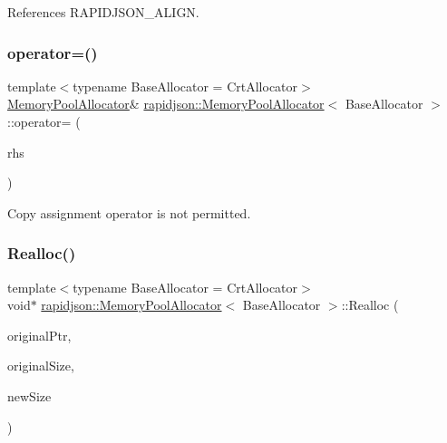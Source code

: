 References R\+A\+P\+I\+D\+J\+S\+O\+N\+\_\+\+A\+L\+I\+GN.

\mbox{\label{classrapidjson_1_1_memory_pool_allocator_aa0691de3f5f34cb7f89628af74c6283b}} 
\subsubsection{\texorpdfstring{operator=()}{operator=()}}
{\footnotesize\ttfamily template$<$typename Base\+Allocator = Crt\+Allocator$>$ \\
\mbox{\hyperlink{classrapidjson_1_1_memory_pool_allocator}{Memory\+Pool\+Allocator}}\& \mbox{\hyperlink{classrapidjson_1_1_memory_pool_allocator}{rapidjson\+::\+Memory\+Pool\+Allocator}}$<$ Base\+Allocator $>$\+::operator= (\begin{DoxyParamCaption}\item[{const \mbox{\hyperlink{classrapidjson_1_1_memory_pool_allocator}{Memory\+Pool\+Allocator}}$<$ Base\+Allocator $>$ \&}]{rhs }\end{DoxyParamCaption})\hspace{0.3cm}{\ttfamily [private]}}



Copy assignment operator is not permitted. 

\mbox{\label{classrapidjson_1_1_memory_pool_allocator_a880524b17bbecb5d2691b8075050d55d}} 
\subsubsection{\texorpdfstring{Realloc()}{Realloc()}}
{\footnotesize\ttfamily template$<$typename Base\+Allocator = Crt\+Allocator$>$ \\
void$\ast$ \mbox{\hyperlink{classrapidjson_1_1_memory_pool_allocator}{rapidjson\+::\+Memory\+Pool\+Allocator}}$<$ Base\+Allocator $>$\+::Realloc (\begin{DoxyParamCaption}\item[{void $\ast$}]{original\+Ptr,  }\item[{size\+\_\+t}]{original\+Size,  }\item[{size\+\_\+t}]{new\+Size }\end{DoxyParamCaption})}



